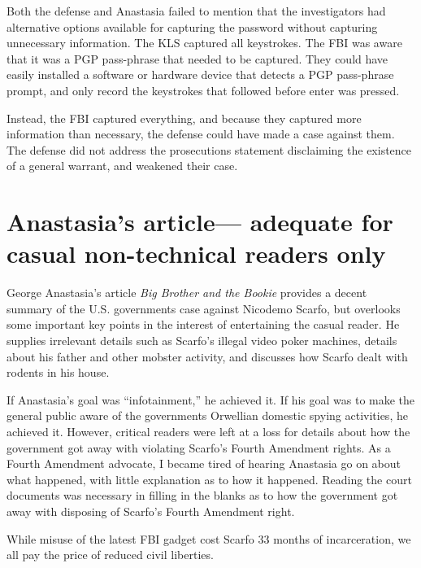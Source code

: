\documentclass[12pt,titlepage]{article}             %
\begin{document}
  Both the defense and Anastasia failed to mention that the
  investigators had alternative options available for capturing the
  password without capturing unnecessary information.  The KLS
  captured all keystrokes.  The FBI was aware that it was a PGP
  pass-phrase that needed to be captured.  They could have easily
  installed a software or hardware device that detects a PGP
  pass-phrase prompt, and only record the keystrokes that followed
  before enter was pressed.  
  
  Instead, the FBI captured everything, and because they captured more
  information than necessary, the defense could have made a case
  against them.  The defense did not address the prosecutions
  statement disclaiming the existence of a general warrant, and
  weakened their case.

  \section{Anastasia's article--- adequate for casual non-technical readers only}
  
  George Anastasia's article \textit{Big Brother and the Bookie}
  provides a decent summary of the U.S. governments case against
  Nicodemo Scarfo, but overlooks some important key points in the
  interest of entertaining the casual reader.  He supplies irrelevant
  details such as Scarfo's illegal video poker machines, details about
  his father and other mobster activity, and discusses how Scarfo
  dealt with rodents in his house.
  
  If Anastasia's goal was ``infotainment,'' he achieved it.  If his
  goal was to make the general public aware of the governments
  Orwellian domestic spying activities, he achieved it.  However,
  critical readers were left at a loss for details about how the
  government got away with violating Scarfo's Fourth Amendment rights.
  As a Fourth Amendment advocate, I became tired of hearing Anastasia
  go on about what happened, with little explanation as to how it
  happened.  Reading the court documents was necessary in filling in
  the blanks as to how the government got away with disposing of
  Scarfo's Fourth Amendment right.
  
  While misuse of the latest FBI gadget cost Scarfo 33 months of
  incarceration, we all pay the price of reduced civil liberties.
\end{document}
